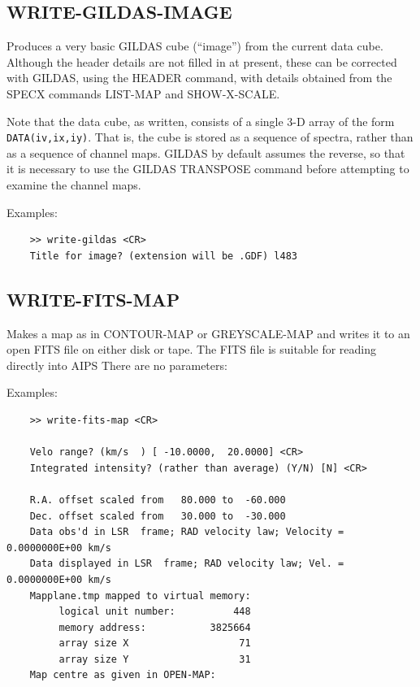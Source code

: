 \documentclass[11pt,twoside]{report}
\begin{document}
\subsection{WRITE-GILDAS-IMAGE}

Produces a very basic GILDAS cube (``image'') from the current data cube.
Although the header details are not filled in at present, these can be
corrected with GILDAS, using the HEADER command, with details obtained from
the SPECX commands LIST-MAP and SHOW-X-SCALE.

Note that the data cube, as written, consists of a single 3-D array
of the form \verb+DATA(iv,ix,iy)+. That is, the cube is stored as a 
sequence of spectra, rather than as a sequence of channel maps. GILDAS
by default assumes the reverse, so that it is necessary to use the GILDAS
TRANSPOSE command before attempting to examine the channel maps.

Examples:
\begin{verbatim}
    >> write-gildas <CR>
    Title for image? (extension will be .GDF) l483
\end{verbatim}

\subsection{WRITE-FITS-MAP} 

Makes a map as in CONTOUR-MAP or GREYSCALE-MAP and writes it 
to an open FITS file on either disk or tape. The FITS file is
suitable for reading directly into AIPS
There are no parameters:

Examples:
\begin{verbatim}
    >> write-fits-map <CR>

    Velo range? (km/s  ) [ -10.0000,  20.0000] <CR>
    Integrated intensity? (rather than average) (Y/N) [N] <CR>

    R.A. offset scaled from   80.000 to  -60.000
    Dec. offset scaled from   30.000 to  -30.000
    Data obs'd in LSR  frame; RAD velocity law; Velocity =   0.0000000E+00 km/s
    Data displayed in LSR  frame; RAD velocity law; Vel. =   0.0000000E+00 km/s
    Mapplane.tmp mapped to virtual memory:
         logical unit number:          448
         memory address:           3825664
         array size X                   71
         array size Y                   31
    Map centre as given in OPEN-MAP:
\end{verbatim}
\end{document}

